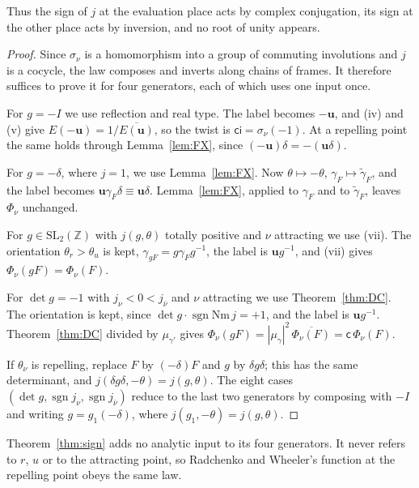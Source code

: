 \documentclass[11pt]{amsart}
\numberwithin{equation}{section}
\theoremstyle{plain}
\theoremstyle{definition}
\theoremstyle{remark}
\begin{document}
Thus the sign of \(j\) at the evaluation place acts by complex conjugation, its sign at the other place acts by inversion, and no root of unity appears.

\begin{proof}
Since \(\sigma_\nu\) is a homomorphism into a group of commuting involutions and \(j\) is a cocycle, the law composes and inverts along chains of frames. It therefore suffices to prove it for four generators, each of which uses one input once.

For \(g=-I\) we use reflection and real type. The label becomes \(-\mathbf u\), and (iv) and (v) give \(E(-\mathbf u)=1/\overline{E(\mathbf u)}\), so the twist is \(\mathsf c\mathsf i=\sigma_\nu(-1)\). At a repelling point the same holds through Lemma~\ref{lem:FX}, since \((-\mathbf u)\delta=-(\mathbf u\delta)\).

For \(g=-\delta\), where \(j=1\), we use Lemma~\ref{lem:FX}. Now \(\theta\mapsto-\theta\), \(\gamma_F\mapsto\tilde\gamma_F\), and the label becomes \(\mathbf u\gamma_F\delta\equiv\mathbf u\delta\). Lemma~\ref{lem:FX}, applied to \(\gamma_F\) and to \(\tilde\gamma_F\), leaves \(\Phi_\nu\) unchanged.

For \(g\in\mathrm{SL}_2(\mathbb Z)\) with \(j(g,\theta)\) totally positive and \(\nu\) attracting we use (vii). The orientation \(\theta_r>\theta_u\) is kept, \(\gamma_{gF}=g\gamma_Fg^{-1}\), the label is \(\mathbf ug^{-1}\), and (vii) gives \(\Phi_\nu(gF)=\Phi_\nu(F)\).

For \(\det g=-1\) with \(j_\nu<0<j_{\bar\nu}\) and \(\nu\) attracting we use Theorem~\ref{thm:DC}. The orientation is kept, since \(\det g\cdot\operatorname{sgn}\mathrm{Nm}\,j=+1\), and the label is \(\mathbf ug^{-1}\). Theorem~\ref{thm:DC} divided by \(\mu_{\gamma'}\) gives \(\Phi_\nu(gF)=|\mu_\gamma|^2\,\overline{\Phi_\nu(F)}=\mathsf c\,\Phi_\nu(F)\).

If \(\theta_\nu\) is repelling, replace \(F\) by \((-\delta)F\) and \(g\) by \(\delta g\delta\); this has the same determinant, and \(j(\delta g\delta,-\theta)=j(g,\theta)\). The eight cases \((\det g,\operatorname{sgn}j_\nu,\operatorname{sgn}j_{\bar\nu})\) reduce to the last two generators by composing with \(-I\) and writing \(g=g_1(-\delta)\), where \(j(g_1,-\theta)=j(g,\theta)\).
\end{proof}

Theorem~\ref{thm:sign} adds no analytic input to its four generators. It never refers to \(r\), \(u\) or to the attracting point, so Radchenko and Wheeler's function at the repelling point obeys the same law.
\end{document}
